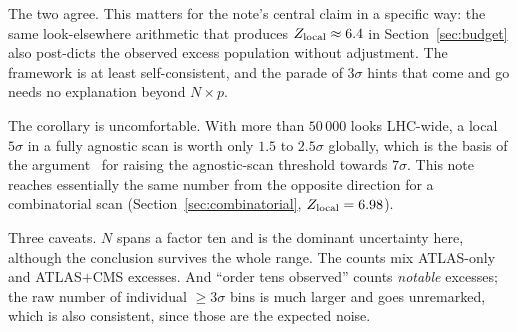 The two agree. This matters for the note's central claim in a specific way: the same
look-elsewhere arithmetic that produces $Z_{\mathrm{local}} \approx 6.4$ in Section~\ref{sec:budget} also
post-dicts the observed excess population without adjustment. The framework is at least
self-consistent, and the parade of $3\sigma$ hints that come and go needs no explanation beyond $N
\times p$.

The corollary is uncomfortable. With more than $50\,000$ looks LHC-wide, a local $5\sigma$ in a
fully agnostic scan is worth only $1.5$ to $2.5\sigma$ globally, which is the basis of the
argument~\cite{statinterp} for raising the agnostic-scan threshold towards $7\sigma$. This note
reaches essentially the same number from the opposite direction for a combinatorial scan
(Section~\ref{sec:combinatorial}, $Z_{\mathrm{local}} = 6.98$).

Three caveats. $N$ spans a factor ten and is the dominant uncertainty here, although the
conclusion survives the whole range. The counts mix ATLAS-only and ATLAS$+$CMS excesses. And
``order tens observed'' counts \emph{notable} excesses; the raw number of individual $\ge3\sigma$
bins is much larger and goes unremarked, which is also consistent, since those are the expected
noise.
